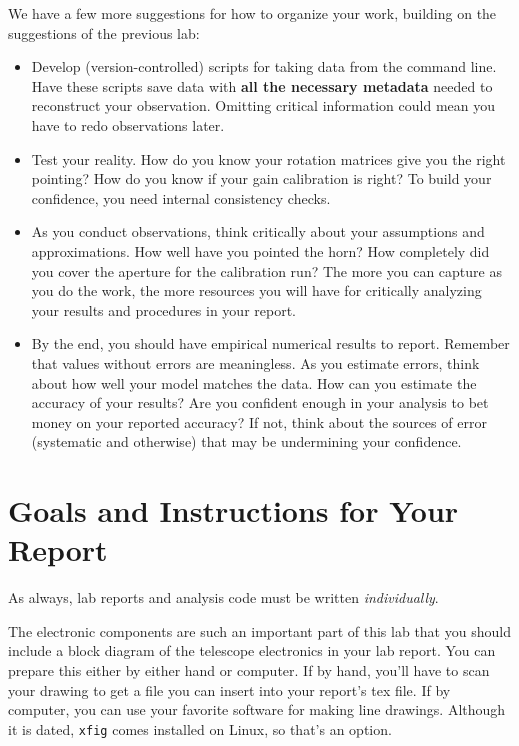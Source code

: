 \documentclass[11pt,preprint]{aastex}
\begin{document}
We have a few more suggestions for how to organize your work, building on the 
suggestions of the previous lab:
\begin{itemize}

\item Develop (version-controlled) scripts for taking data from the command line.
Have these scripts save data with {\bf all the necessary metadata} needed to 
reconstruct your observation. Omitting critical information could
mean you have to redo observations later.

\item Test your reality. How do you know your rotation matrices give you the
right pointing? How do you know if your gain calibration is right? To build
your confidence, you need internal consistency checks.

\item As you conduct observations, think critically about your assumptions and
approximations.  How well have you pointed the horn? How completely did
you cover the aperture for the calibration run? The more you can capture
as you do the work, the more resources you will have for critically analyzing your
results and procedures in your report.

\item By the end, you should have empirical numerical results to report. Remember
that values without errors are meaningless. As you estimate errors, think about how 
well your model matches the data. How can you estimate the
accuracy of your results? Are you confident enough in your analysis to
bet money on your reported accuracy? If not, think about the sources of error
(systematic and otherwise) that may be undermining your confidence.

\end{itemize}


\section{Goals and Instructions for Your Report} \label{sec:goals}

\noindent
As always, lab reports and analysis code must be written {\it individually}. 

The electronic components are such an important part of this
lab that you should include a block diagram of the telescope electronics
in your lab report. You can prepare this either by either hand or
computer. If by hand, you'll have to scan your drawing to get a file you can
insert into your report's tex file. If by computer, you can use your
favorite software for making line drawings.  Although it is dated, {\tt xfig}
comes installed on Linux, so that's an option.
\end{document}

